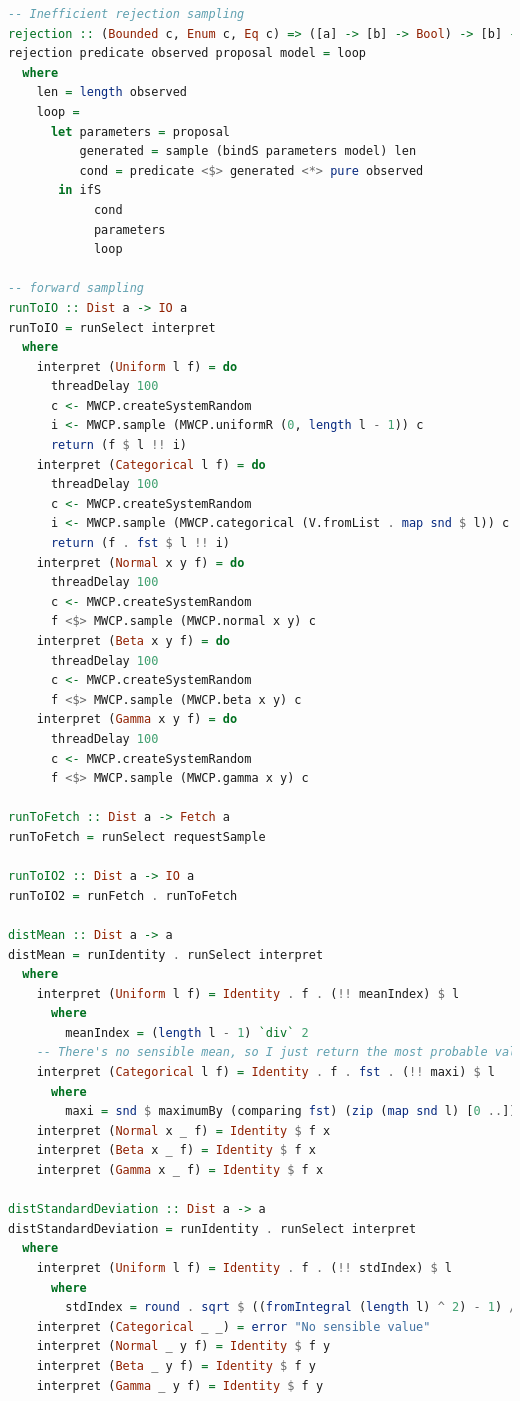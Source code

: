 \documentclass[
  oneside,
  11pt, a4paper,
  footinclude=true,
  headinclude=true,
  cleardoublepage=empty
]{scrbook}
\theoremstyle{definition}
\theoremstyle{definition}
\begin{document}
\begin{lstlisting}[language=Haskell, caption={SelectiveProb.hs},captionpos=b]
-- Inefficient rejection sampling
rejection :: (Bounded c, Enum c, Eq c) => ([a] -> [b] -> Bool) -> [b] -> Dist c -> (c -> Dist a) -> Dist c
rejection predicate observed proposal model = loop
  where
    len = length observed
    loop =
      let parameters = proposal
          generated = sample (bindS parameters model) len
          cond = predicate <$> generated <*> pure observed
       in ifS
            cond
            parameters
            loop

-- forward sampling
runToIO :: Dist a -> IO a
runToIO = runSelect interpret
  where
    interpret (Uniform l f) = do
      threadDelay 100
      c <- MWCP.createSystemRandom
      i <- MWCP.sample (MWCP.uniformR (0, length l - 1)) c
      return (f $ l !! i)
    interpret (Categorical l f) = do
      threadDelay 100
      c <- MWCP.createSystemRandom
      i <- MWCP.sample (MWCP.categorical (V.fromList . map snd $ l)) c
      return (f . fst $ l !! i)
    interpret (Normal x y f) = do
      threadDelay 100
      c <- MWCP.createSystemRandom
      f <$> MWCP.sample (MWCP.normal x y) c
    interpret (Beta x y f) = do
      threadDelay 100
      c <- MWCP.createSystemRandom
      f <$> MWCP.sample (MWCP.beta x y) c
    interpret (Gamma x y f) = do
      threadDelay 100
      c <- MWCP.createSystemRandom
      f <$> MWCP.sample (MWCP.gamma x y) c

runToFetch :: Dist a -> Fetch a
runToFetch = runSelect requestSample

runToIO2 :: Dist a -> IO a
runToIO2 = runFetch . runToFetch

distMean :: Dist a -> a
distMean = runIdentity . runSelect interpret
  where
    interpret (Uniform l f) = Identity . f . (!! meanIndex) $ l
      where
        meanIndex = (length l - 1) `div` 2
    -- There's no sensible mean, so I just return the most probable value
    interpret (Categorical l f) = Identity . f . fst . (!! maxi) $ l
      where
        maxi = snd $ maximumBy (comparing fst) (zip (map snd l) [0 ..])
    interpret (Normal x _ f) = Identity $ f x
    interpret (Beta x _ f) = Identity $ f x
    interpret (Gamma x _ f) = Identity $ f x

distStandardDeviation :: Dist a -> a
distStandardDeviation = runIdentity . runSelect interpret
  where
    interpret (Uniform l f) = Identity . f . (!! stdIndex) $ l
      where
        stdIndex = round . sqrt $ ((fromIntegral (length l) ^ 2) - 1) / 12
    interpret (Categorical _ _) = error "No sensible value"
    interpret (Normal _ y f) = Identity $ f y
    interpret (Beta _ y f) = Identity $ f y
    interpret (Gamma _ y f) = Identity $ f y


\end{lstlisting}
\end{document}
